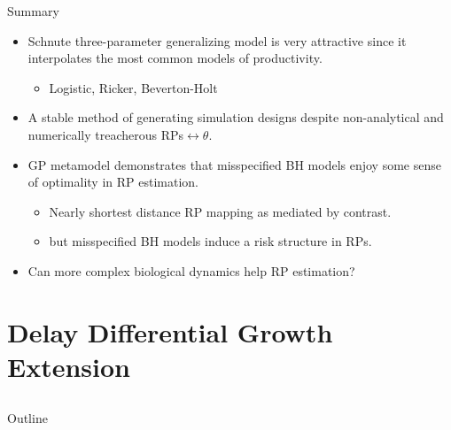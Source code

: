 \documentclass[ xcolor = pdftex, dvipsnames, table ]{beamer}
\begin{document}
\begin{frame}{Summary}
\begin{itemize}
\setlength\itemsep{1em}
        \item Schnute three-parameter generalizing model is very attractive since it  
	interpolates the most common models of productivity. 
	\begin{itemize}
		\item Logistic, Ricker, Beverton-Holt
	\end{itemize}
        \item A stable method of generating simulation designs despite non-analytical 
	and numerically treacherous RPs$\leftrightarrow\theta$.	
	\item GP metamodel demonstrates that misspecified BH models enjoy some sense of optimality in RP estimation.
	\begin{itemize}
	 	\item Nearly shortest distance RP mapping as mediated by contrast.
		\item but misspecified BH models induce a risk structure in RPs.
	\end{itemize}
	\item Can more complex biological dynamics help RP estimation?
\end{itemize}

\end{frame}

%
\section{Delay Differential Growth Extension}
\subsection{}
\begin{frame}{Outline}
\end{frame}
\end{document}

